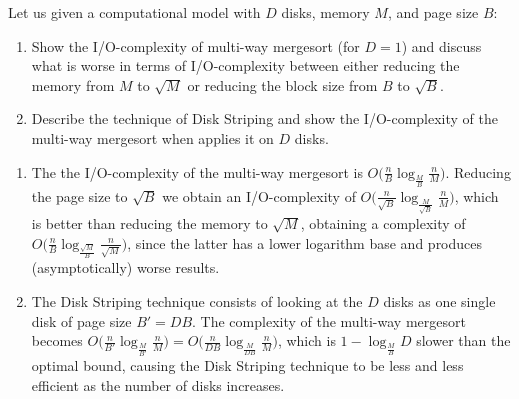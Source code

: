 \exercise

Let us given a computational model with $D$ disks, memory $M$, and page size
$B$:
%
\begin{enumerate}

  \item Show the I/O-complexity of multi-way mergesort (for $D = 1$) and discuss
  what is worse in terms of I/O-complexity between either reducing the memory
  from $M$ to $\sqrt{M}$ or reducing the block size from $B$ to $\sqrt{B}$.

  \item Describe the technique of Disk Striping and show the I/O-complexity of
  the multi-way mergesort when applies it on $D$ disks.

\end{enumerate}

\solution

\begin{enumerate}

  \item The the I/O-complexity of the multi-way mergesort is $O\Big(\frac{n}{B}
  \log_{\frac{M}{B}} \frac{n}{M}\Big)$. Reducing the page size to $\sqrt{B}$ we
  obtain an I/O-complexity of $O\Big(\frac{n}{\sqrt{B}}
  \log_{\frac{M}{\sqrt{B}}} \frac{n}{M}\Big)$, which is better than reducing the
  memory to $\sqrt{M}$, obtaining a complexity of $O\Big(\frac{n}{B}
  \log_{\frac{\sqrt{M}}{B}} \frac{n}{\sqrt{M}}\Big)$, since the latter has a
  lower logarithm base and produces (asymptotically) worse results.

  \item The Disk Striping technique consists of looking at the $D$ disks as one
  single disk of page size $B' = DB$. The complexity of the multi-way mergesort
  becomes $O\Big(\frac{n}{B'} \log_{\frac{M}{B'}} \frac{n}{M}\Big) =
  O\Big(\frac{n}{DB} \log_{\frac{M}{DB}} \frac{n}{M}\Big)$, which is $1 -
  \log_{\frac{M}{B}} D$ slower than the optimal bound, causing the Disk Striping
  technique to be less and less efficient as the number of disks increases.

\end{enumerate}

